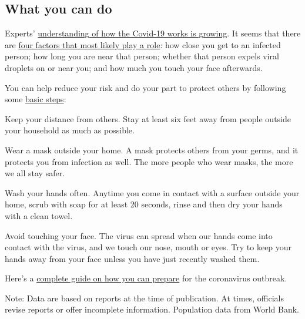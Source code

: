 \hypertarget{what-you-can-do}{%
\subsection{What you can do}\label{what-you-can-do}}

Experts'
\href{https://www.nytimes3xbfgragh.onion/2020/06/02/health/coronavirus-profile-covid.html}{understanding
of how the Covid-19 works is growing}. It seems that there are
\href{https://www.nytimes3xbfgragh.onion/article/coronavirus-how-it-spreads.html}{four
factors that most likely play a role}: how close you get to an infected
person; how long you are near that person; whether that person expels
viral droplets on or near you; and how much you touch your face
afterwards.

You can help reduce your risk and do your part to protect others by
following some
\href{https://www.nytimes3xbfgragh.onion/article/prepare-for-coronavirus.html}{basic
steps}:

Keep your distance from others. Stay at least six feet away from people
outside your household as much as possible.

Wear a mask outside your home. A mask protects others from your germs,
and it protects you from infection as well. The more people who wear
masks, the more we all stay safer.

Wash your hands often. Anytime you come in contact with a surface
outside your home, scrub with soap for at least 20 seconds, rinse and
then dry your hands with a clean towel.

Avoid touching your face. The virus can spread when our hands come into
contact with the virus, and we touch our nose, mouth or eyes. Try to
keep your hands away from your face unless you have just recently washed
them.

Here's a
\href{https://www.nytimes3xbfgragh.onion/interactive/2020/world/coronavirus-tips-advice.html}{complete
guide on how you can prepare} for the coronavirus outbreak.

Note: Data are based on reports at the time of publication. At times,
officials revise reports or offer incomplete information. Population
data from World Bank.

